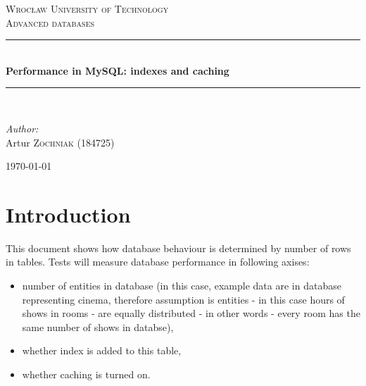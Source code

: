 \documentclass[10pt,a4paper]{article}
\newcommand{\HRule}{\rule{\linewidth}{0.5mm}}
\begin{document}
\begin{titlepage}
\begin{center}


\textsc{\LARGE Wrocław University of Technology}\\[1.5cm]

\textsc{\Large Advanced databases}\\[0.5cm]

\HRule \\[0.4cm]
{ \huge \bfseries Performance in MySQL: indexes and caching \\[0.4cm] }

\HRule \\[1.5cm]

\begin{minipage}{0.4\textwidth}
\begin{flushright} \large
\emph{Author:} \\
Artur \textsc{Zochniak} (184725)
\end{flushright}
\end{minipage}

\vfill

{\large \today}

\end{center}
\end{titlepage}

\newpage

\section{Introduction}
This document shows how database behaviour is determined by number of rows in tables. 
Tests will measure database performance in following axises: 
\begin {itemize}
\item number of entities in database (in this case, example data are in database representing cinema, therefore assumption is entities - in this case hours of shows in rooms - are equally distributed - in other words - every room has the same number of shows in databse), 
\item whether index is added to this table, 
\item whether caching is turned on. 
\end{itemize}
\end{document}
